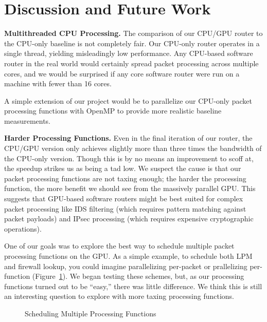 \section{Discussion and Future Work}
\label{sec:disc}

\noindent \textbf{Multithreaded CPU Processing.} The comparison of our CPU/GPU
router to the CPU-only baseline is not completely fair. Our CPU-only router
operates in a single thread, yielding misleadingly low performance. Any
CPU-based software router in the real world would certainly spread packet
processing across multiple cores, and we would be surprised if any core
software router were run on a machine with fewer than 16 cores.

A simple extension of our project would be to parallelize our CPU-only packet
processing functions with OpenMP to provide more realistic baseline
measurements.

\medskip \noindent \textbf{Harder Processing Functions.} Even in the final
iteration of our router, the CPU/GPU version only achieves slightly more than
three times the bandwidth of the CPU-only version. Though this is by no means
an improvement to scoff at, the speedup strikes us as being a tad low. We
suspect the cause is that our packet processing functions are not taxing
enough; the harder the processing function, the more benefit we should see from
the massively parallel GPU. This suggests that GPU-based software routers might
be best suited for complex packet processing like IDS filtering (which requires
pattern matching against packet payloads) and IPsec processing (which requires
expensive cryptographic operations).

One of our goals was to explore the best way to schedule multiple packet
processing functions on the GPU. As a simple example, to schedule both LPM and
firewall lookup, you could imagine parallelizing per-packet or prallelizing
per-function (Figure~\ref{fig:scheduling}). We began testing these schemes,
but, as our processing functions turned out to be ``easy,'' there was little
difference. We think this is still an interesting question to explore with more
taxing processing functions.

\begin{figure}
    \centering

	\medskip

    \caption{Scheduling Multiple Processing Functions}
	\label{fig:scheduling}
\end{figure}

